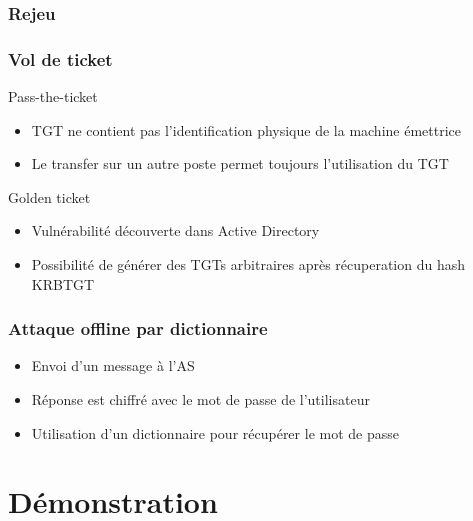 \documentclass[svgnames]{beamer}
\begin{document}
\begin{frame}
 \frametitle{Rejeu}
 
\end{frame}

\begin{frame}
 \frametitle{Vol de ticket}
 
 
 \begin{block}{Pass-the-ticket}
  \begin{itemize}
   \item TGT ne contient pas l'identification physique de la machine émettrice
   \item Le transfer sur un autre poste permet toujours l'utilisation du TGT
  \end{itemize}
 \end{block}
 
 \begin{block}{Golden ticket}
  \begin{itemize}
   \item Vulnérabilité découverte dans Active Directory
   \item Possibilité de générer des TGTs arbitraires après récuperation du hash KRBTGT
  \end{itemize}
 \end{block}
\end{frame}


\begin{frame}
 \frametitle{Attaque offline par dictionnaire}
   \begin{itemize}
   \item Envoi d'un message à l'AS
   \item Réponse est chiffré avec le mot de passe de l'utilisateur
   \item Utilisation d'un dictionnaire pour récupérer le mot de passe
  \end{itemize}
 
 
\end{frame}


\section{Démonstration}
\end{document}
